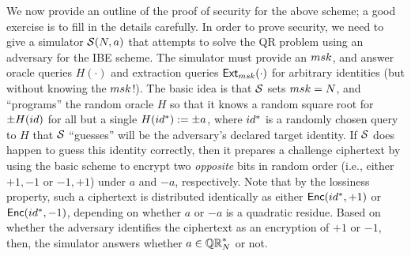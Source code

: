 \documentclass[11pt]{article}
\begin{document}
We now provide an outline of the proof of security for the above
scheme; a good exercise is to fill in the details carefully.  In order
to prove security, we need to give a simulator $\mathcal{S}(N,a)$ that
attempts to solve the QR problem using an adversary for the IBE
scheme.  The simulator must provide an $msk$, and answer oracle
queries $H(\cdot)$ and extraction queries $\mathsf{Ext}_{msk}(\cdot)$ for
arbitrary identities (but without knowing the $msk$!).  The basic
idea is that $\mathcal{S}$ sets $msk = N$, and ``programs'' the random
oracle $H$ so that it knows a random square root for $\pm H(id)$ for
all but a single $H(id^*) := \pm a$, where $id^{*}$ is a randomly
chosen query to $H$ that $\mathcal{S}$ ``guesses'' will be the adversary's
declared target identity.  If $\mathcal{S}$ does happen to guess this
identity correctly, then it prepares a challenge ciphertext by using
the basic scheme to encrypt two \emph{opposite} bits in random order
(i.e., either $+1, -1$ or $-1, +1$) under $a$ and $-a$, respectively.
Note that by the lossiness property, such a ciphertext is distributed
identically as either $\mathsf{Enc}(id^{*}, +1)$ or $\mathsf{Enc}(id^{*},
-1)$, depending on whether $a$ or $-a$ is a quadratic residue.  Based
on whether the adversary identifies the ciphertext as an encryption of
$+1$ or $-1$, then, the simulator answers whether $a \in \mathbb{QR}_{N}^{*}$ or
not.
\end{document}
